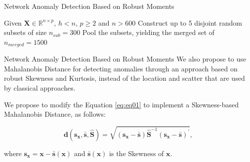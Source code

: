 \documentclass[newPxFont, numfooter, sectionpages]{beamer}
\begin{document}
\begin{frame}[c]{Network Anomaly Detection Based on Robust Moments}
	\begin{algorithm}[H]\label{alg:alg07}
		\scriptsize
		\SetAlgoLined
		Given $\boldsymbol{X} \in \mathbb{R}^{n \times p}$, $h < n$, $p \geq 2$ and $n > 600$\;
		Construct up to 5 disjoint random subsets of size $n_{sub} = 300$\;
		Pool the subsets, yielding the merged set of $n_{merged} = 1500$\;
		\caption{Fast-MCD with higher moments when $n > 600$}
	\end{algorithm}
\end{frame}

\begin{frame}{Network Anomaly Detection Based on Robust Moments}
    We also propose to use Mahalanobis Distance for detecting anomalies through an approach based on robust Skewness and Kurtosis, instead of the location and scatter that are used by classical approaches.
    
    We propose to modify the Equation \ref{eq:eq01} to implement a Skewness-based Mahalanobis Distance, as follows:
    
    \begin{equation}\label{eq:eq08}
		\boldsymbol{d}(\boldsymbol{s}_{\boldsymbol{x}}, \bar{\boldsymbol{s}}, \boldsymbol{\hat{S}}) = \sqrt{(\boldsymbol{s}_{\boldsymbol{x}} - \bar{\boldsymbol{s}}) \boldsymbol{\hat{S}}^{-1}(\boldsymbol{s}_{\boldsymbol{x}} - \bar{\boldsymbol{s}})^\prime}, 
	\end{equation}
	
	where $\boldsymbol{s}_{\boldsymbol{x}} = \boldsymbol{x} - \boldsymbol{\bar{s}}(\boldsymbol{x})$ and $\boldsymbol{\bar{s}}(\boldsymbol{x})$ is the Skewness of $\boldsymbol{x}$.

\end{frame}
\end{document}
